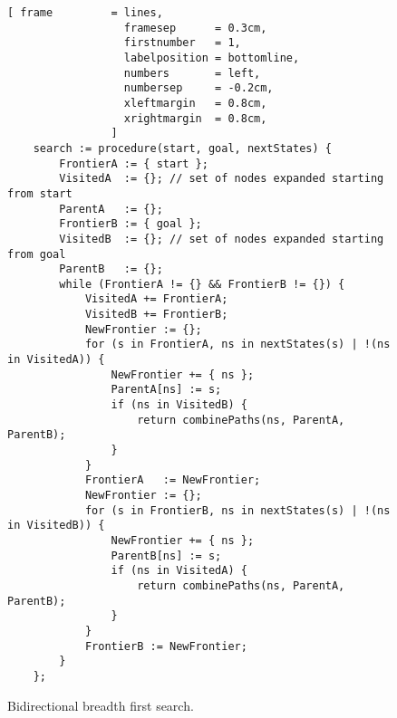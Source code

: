 \begin{figure}[!ht]
\centering
\begin{Verbatim}[ frame         = lines,
                  framesep      = 0.3cm,
                  firstnumber   = 1,
                  labelposition = bottomline,
                  numbers       = left,
                  numbersep     = -0.2cm,
                  xleftmargin   = 0.8cm,
                  xrightmargin  = 0.8cm,
                ]
    search := procedure(start, goal, nextStates) {
        FrontierA := { start };
        VisitedA  := {}; // set of nodes expanded starting from start
        ParentA   := {};
        FrontierB := { goal };
        VisitedB  := {}; // set of nodes expanded starting from goal
        ParentB   := {};
        while (FrontierA != {} && FrontierB != {}) {
            VisitedA += FrontierA;
            VisitedB += FrontierB;
            NewFrontier := {};
            for (s in FrontierA, ns in nextStates(s) | !(ns in VisitedA)) {
                NewFrontier += { ns };
                ParentA[ns] := s;
                if (ns in VisitedB) {
                    return combinePaths(ns, ParentA, ParentB);
                }
            }
            FrontierA   := NewFrontier;
            NewFrontier := {};
            for (s in FrontierB, ns in nextStates(s) | !(ns in VisitedB)) {
                NewFrontier += { ns };
                ParentB[ns] := s;
                if (ns in VisitedA) {
                    return combinePaths(ns, ParentA, ParentB);
                }
            }
            FrontierB := NewFrontier;
        }
    };
\end{Verbatim}
\vspace*{-0.3cm}
\caption{Bidirectional breadth first search.}
\label{fig:bidirectional-bfs.stlx}
\end{figure}

